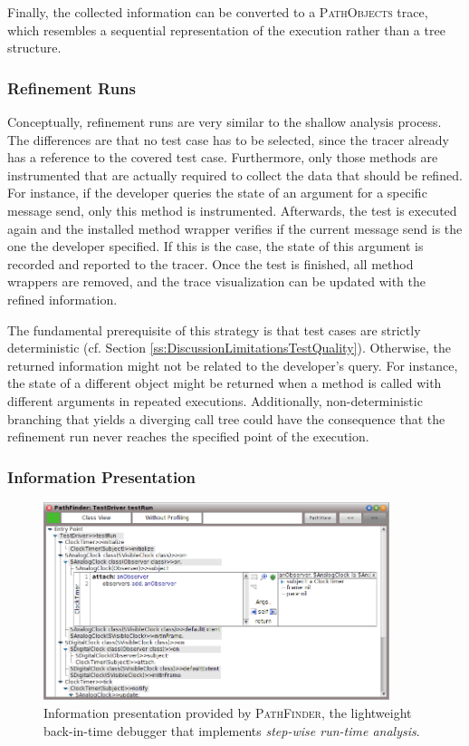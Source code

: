 Finally, the collected information can be converted to a \textsc{PathObjects} trace, which resembles a sequential representation of the execution rather than a tree structure.

\subsubsection{Refinement Runs}
Conceptually, refinement runs are very similar to the shallow analysis process.
The differences are that no test case has to be selected, since the tracer already has a reference to the covered test case.
Furthermore, only those methods are instrumented that are actually required to collect the data that should be refined.
For instance, if the developer queries the state of an argument for a specific message send, only this method is instrumented.
Afterwards, the test is executed again and the installed method wrapper verifies if the current message send is the one the developer specified.
If this is the case, the state of this argument is recorded and reported to the tracer.
Once the test is finished, all method wrappers are removed, and the trace visualization can be updated with the refined information.

The fundamental prerequisite of this strategy is that test cases are strictly deterministic (cf. Section \ref{ss:DiscussionLimitationsTestQuality}).
Otherwise, the returned information might not be related to the developer's query.
For instance, the state of a different object might be returned when a method is called with different arguments in repeated executions.
Additionally, non-deterministic branching that yields a diverging call tree could have the consequence that the refinement run never reaches the specified point of the execution.

\subsubsection{Information Presentation}

\begin{figure}[tb]
	\centering
	\includegraphics[width=0.9\textwidth]{../images/02-TracingPathFinder}
	\caption[Information Presentation Provided by PathFinder]{Information presentation provided by \textsc{PathFinder}, the lightweight back-in-time debugger that implements \emph{step-wise run-time analysis}.}
	\label{fig:BackgroundPathFinder}
\end{figure}

